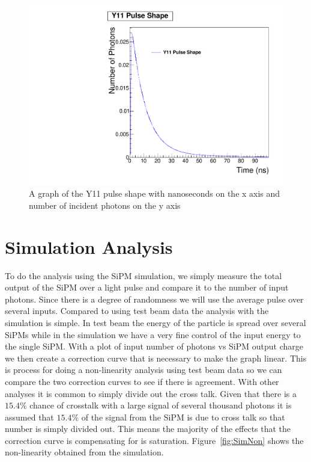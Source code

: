 \begin{figure}
\centering
\includegraphics[width=\linewidth]{Figures/Y11.pdf}
\caption{A graph of the Y11 pulse shape with nanoseconds on the x axis and number of incident photons on the y axis}
\label{fig:Y11}
\end{figure}

\section{Simulation Analysis}

To do the analysis using the SiPM simulation, we simply measure the total output of the SiPM over a light pulse and compare it to the number of input photons. Since there is a degree of randomness we will use the average pulse over several inputs. Compared to using test beam data the analysis with the simulation is simple. In test beam the energy of the particle is spread over several SiPMs while in the simulation we have a very fine control of the input energy to the single SiPM. With a plot of input number of photons vs SiPM output charge we then create a correction curve that is necessary to make the graph linear. This is process for doing a non-linearity analysis using test beam data so we can compare the two correction curves to see if there is agreement. With other analyses it is common to simply divide out the cross talk. Given that there is a $15.4\%$ chance of crosstalk with a large signal of several thousand photons it is assumed that $15.4\%$ of the signal from the SiPM is due to cross talk so that number is simply divided out. This means the majority of the effects that the correction curve is compensating for is saturation. Figure~\ref{fig:SimNon} shows the non-linearity obtained from the simulation.

